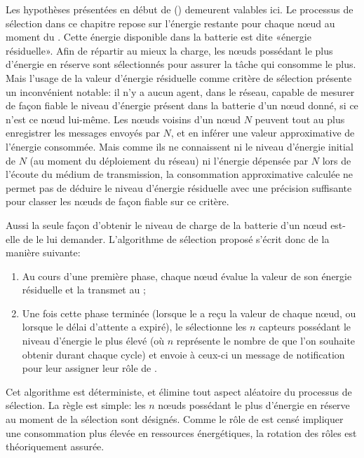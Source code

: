 Les hypothèses présentées en début de  () demeurent valables ici.
Le processus de sélection dans ce chapitre repose sur l'énergie restante pour chaque nœud au moment du .
Cette énergie disponible dans la batterie est dite «énergie résiduelle».
Afin de répartir au mieux la charge, les nœuds possédant le plus d'énergie en réserve sont sélectionnés pour assurer la tâche qui consomme le plus.
Mais l'usage de la valeur d'énergie résiduelle comme critère de sélection présente un inconvénient notable: il n'y a aucun agent, dans le réseau, capable de mesurer de façon fiable le niveau d'énergie présent dans la batterie d'un nœud donné, si ce n'est ce nœud lui-même.
Les nœuds voisins d'un nœud $N$ peuvent tout au plus enregistrer les messages envoyés par $N$\kern-1pt, et en inférer une valeur approximative de l'énergie consommée.
Mais comme ils ne connaissent ni le niveau d'énergie initial de $N$ (au moment du déploiement du réseau) ni l'énergie dépensée par $N$ lors de l'écoute du médium de transmission, la consommation approximative calculée ne permet pas de déduire le niveau d'énergie résiduelle avec une précision suffisante pour classer les nœuds de façon fiable sur ce critère.

Aussi la seule façon d'obtenir le niveau de charge de la batterie d'un nœud est-elle de le lui demander.
L'algorithme de sélection proposé s'écrit donc de la manière suivante:
\begin{enumerate}
    \item Au cours d'une première phase, chaque nœud évalue la valeur de son énergie résiduelle et la transmet au \ch;
    \item Une fois cette phase terminée (lorsque le \ch a reçu la valeur de chaque nœud, ou lorsque le délai d'attente a expiré), le \CH sélectionne les $n$ capteurs possédant le niveau d'énergie le plus élevé (où $n$ représente le nombre de \cns que l'on souhaite obtenir durant chaque cycle) et envoie à ceux-ci un message de notification pour leur assigner leur rôle de \cn.
\end{enumerate}
Cet algorithme est déterministe, et élimine tout aspect aléatoire du processus de sélection.
La règle est simple: les $n$ nœuds possédant le plus d'énergie en réserve au moment de la sélection sont désignés.
Comme le rôle de \cn est censé impliquer une consommation plus élevée en ressources énergétiques, la rotation des rôles est théoriquement assurée.

